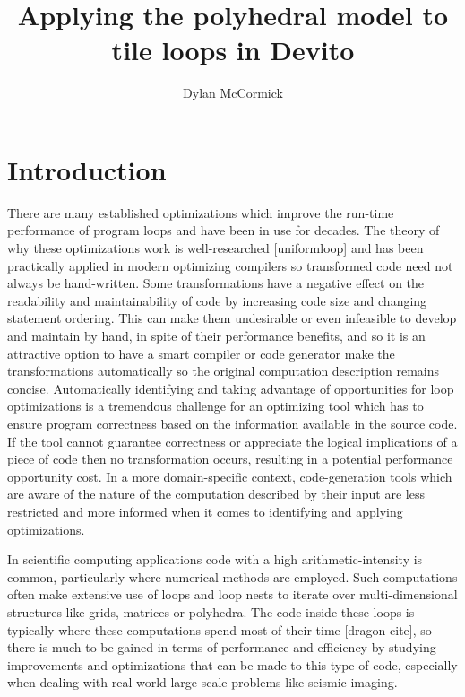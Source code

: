 \documentclass[a4paper,12pt,twoside]{report}
\title{Applying the polyhedral model to tile loops in Devito}
\author{Dylan McCormick}
\begin{document}
\maketitle

\tableofcontents

\chapter{Introduction}
There are many established optimizations which improve the run-time performance of program loops and have been in use for decades.
The theory of why these optimizations work is well-researched [uniformloop] and has been practically applied in modern optimizing compilers so
transformed code need not always be hand-written. Some transformations have a negative effect on the readability and maintainability of code by
increasing code size and changing statement ordering. This can make them undesirable or even infeasible to develop and maintain by hand, in spite
of their performance benefits, and so it is an attractive option to have a smart compiler or code generator make the transformations automatically so the
original computation description remains concise. Automatically identifying and taking advantage of opportunities for loop optimizations is a tremendous
challenge for an optimizing tool which has to ensure program correctness based on the information available in the source code. If the tool cannot guarantee
correctness or appreciate the logical implications of a piece of code then no transformation occurs, resulting in a potential performance opportunity cost.
In a more domain-specific context, code-generation tools which are aware of the nature of the computation described by their input are less
restricted and more informed when it comes to identifying and applying optimizations.

In scientific computing applications code with a high arithmetic-intensity is common, particularly where numerical methods are employed.
Such computations often make extensive use of loops and loop nests to iterate over multi-dimensional structures like grids, matrices or
polyhedra. The code inside these loops is typically where these computations spend most of their time [dragon cite], so there is much to be gained
in terms of performance and efficiency by studying improvements and optimizations that can be made to this type of code, especially when dealing
with real-world large-scale problems like seismic imaging.
\end{document}
